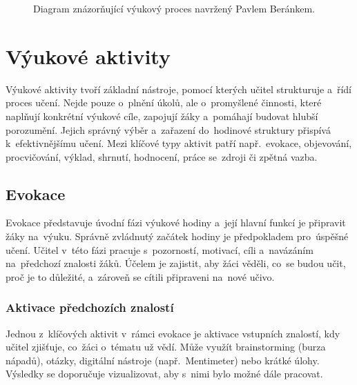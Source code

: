 \documentclass[male,czech,api_bc]{kitheses}
\begin{document}
\begin{figure}[H]
	\centering
	\caption{Diagram znázorňující výukový proces navržený Pavlem Beránkem.}
	\label{fig:vyukovy-proces}
\end{figure}

\section{Výukové aktivity}
Výukové aktivity tvoří základní nástroje, pomocí kterých učitel strukturuje a~řídí proces učení. Nejde pouze o~plnění úkolů, ale o~promyšlené činnosti, které naplňují konkrétní výukové cíle, zapojují žáky a~pomáhají budovat hlubší porozumění. Jejich správný výběr a~zařazení do~hodinové struktury přispívá k~efektivnějšímu učení. Mezi klíčové typy aktivit patří např.~evokace, objevování, procvičování, výklad, shrnutí, hodnocení, práce se~zdroji či zpětná vazba.

\subsection{Evokace}

Evokace představuje úvodní fázi výukové hodiny a~její hlavní funkcí je připravit žáky na~výuku. Správně zvládnutý začátek hodiny je předpokladem pro~úspěšné učení. Učitel v~této fázi pracuje s~pozorností, motivací, cíli a~navázáním na~předchozí znalosti žáků. Účelem je zajistit, aby žáci věděli, co~se budou učit, proč je to důležité, a~zároveň se cítili připraveni na~nové učivo.

\subsubsection{Aktivace předchozích znalostí} Jednou z~klíčových aktivit v~rámci evokace je aktivace vstupních znalostí, kdy učitel zjišťuje, co~žáci o~tématu už vědí. Může využít brainstorming (burza nápadů), otázky, digitální nástroje (např.~Mentimeter) nebo krátké úlohy. Výsledky se doporučuje vizualizovat, aby s~nimi bylo možné dále pracovat.
\end{document}
